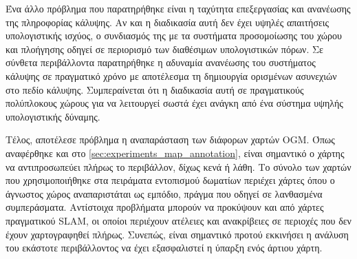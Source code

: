 Ένα άλλο πρόβλημα που παρατηρήθηκε είναι η ταχύτητα επεξεργασίας και ανανέωσης της πληροφορίας κάλυψης. Αν και η διαδικασία αυτή δεν έχει υψηλές απαιτήσεις υπολογιστικής ισχύος, ο συνδιασμός της με τα συστήματα προσομοίωσης του χώρου και πλοήγησης οδηγεί σε περιορισμό των διαθέσιμων υπολογιστικών πόρων. Σε σύνθετα περιβάλλοντα παρατηρήθηκε η αδυναμία ανανέωσης του συστήματος κάλυψης σε πραγματικό χρόνο με αποτέλεσμα τη δημιουργία ορισμένων ασυνεχιών στο πεδίο κάλυψης. Συμπεραίνεται ότι η διαδικασία αυτή σε πραγματικούς πολύπλοκους χώρους για να λειτουργεί σωστά έχει ανάγκη από ένα σύστημα υψηλής υπολογιστικής δύναμης.

Τέλος, αποτέλεσε πρόβλημα η αναπαράσταση των διάφορων χαρτών OGM. Όπως αναφέρθηκε και στο \autoref{sec:experiments_map_annotation}, είναι σημαντικό ο χάρτης να αντιπροσωπεύει πλήρως το περιβάλλον, δίχως κενά ή λάθη. Το σύνολο των χαρτών που χρησιμοποιήθηκε στα πειράματα εντοπισμού δωματίων περιέχει χάρτες όπου ο άγνωστος χώρος αναπαριστάται ως εμπόδιο, πράγμα που οδηγεί σε λανθασμένα συμπεράσματα. Αντίστοιχα προβλήματα μπορούν να προκύψουν και από χάρτες πραγματικού SLAM, οι οποίοι περιέχουν ατέλειες και ανακρίβειες σε περιοχές που δεν έχουν χαρτογραφηθεί πλήρως. Συνεπώς, είναι σημαντικό προτού εκκινήσει η ανάλυση του εκάστοτε περιβάλλοντος να έχει εξασφαλιστεί η ύπαρξη ενός άρτιου χάρτη.